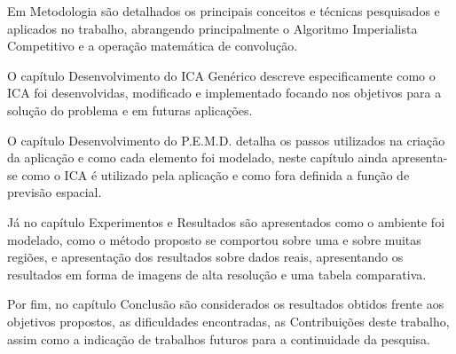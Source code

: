 Em Metodologia são detalhados os principais conceitos e técnicas pesquisados e aplicados no trabalho, abrangendo principalmente o Algoritmo Imperialista Competitivo e a operação matemática de convolução.

O capítulo Desenvolvimento do ICA Genérico descreve especificamente como o ICA foi desenvolvidas, modificado e implementado focando nos objetivos para a solução do problema e em futuras aplicações.

O capítulo Desenvolvimento do P.E.M.D. detalha os passos utilizados na criação da aplicação e como cada elemento foi modelado, neste capítulo ainda apresenta-se como o ICA é utilizado pela aplicação e como fora definida a função de previsão espacial.

Já no capítulo Experimentos e Resultados são apresentados como o ambiente foi modelado, como o método proposto se comportou sobre uma e sobre muitas regiões, e apresentação dos resultados sobre dados reais, apresentando os resultados em forma de imagens de alta resolução e uma tabela comparativa.

Por fim, no capítulo Conclusão são considerados os resultados obtidos frente aos objetivos propostos, as dificuldades encontradas, as Contribuições deste trabalho, assim como a indicação de trabalhos futuros para a continuidade da pesquisa.



